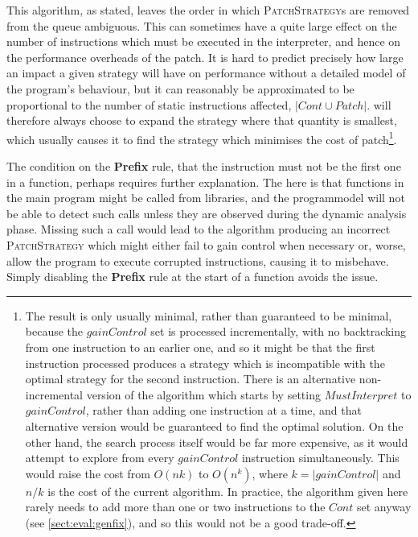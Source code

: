 This algorithm, as stated, leaves the order in which
\textsc{PatchStrategy}s are removed from the queue ambiguous.  This
can sometimes have a quite large effect on the number of instructions
which must be executed in the interpreter, and hence on the
performance overheads of the patch.  It is hard to predict precisely
how large an impact a given strategy will have on performance without
a detailed model of the program's behaviour, but it can reasonably be
approximated to be proportional to the number of static instructions
affected, $|\mathit{Cont} \cup \mathit{Patch}|$.  {\Implementation}
will therefore always choose to expand the strategy where that
quantity is smallest, which usually causes it to find the strategy
which minimises the cost of patch\footnote{The result is only usually
  minimal, rather than guaranteed to be minimal, because the
  $\mathit{gainControl}$ set is processed incrementally, with no
  backtracking from one instruction to an earlier one, and so it might
  be that the first instruction processed produces a strategy which is
  incompatible with the optimal strategy for the second instruction.
  There is an alternative non-incremental version of the algorithm
  which starts by setting $\mathit{MustInterpret}$ to
  $\mathit{gainControl}$, rather than adding one instruction at a
  time, and that alternative version would be guaranteed to find the
  optimal solution.  On the other hand, the search process itself
  would be far more expensive, as it would attempt to explore from
  every $\mathit{gainControl}$ instruction simultaneously.  This would
  raise the cost from $O(nk)$ to $O(n^k)$, where $k =
  |\mathit{gainControl}|$ and $n/k$ is the cost of the current
  algorithm.  In practice, the algorithm given here rarely needs to
  add more than one or two instructions to the $\mathit{Cont}$ set
  anyway (see \autoref{sect:eval:genfix}), and so this would not be a
  good trade-off.}.

The condition on the \textbf{Prefix} rule, that the instruction must
not be the first one in a function, perhaps requires further
explanation.  The here is that functions in the main program might be
called from libraries, and the \gls{programmodel} will not be able to
detect such calls unless they are observed during the dynamic analysis
phase.  Missing such a call would lead to the algorithm producing an
incorrect \textsc{PatchStrategy} which might either fail to gain
control when necessary or, worse, allow the program to execute
corrupted instructions, causing it to misbehave.  Simply disabling the
\textbf{Prefix} rule at the start of a function avoids the issue.


